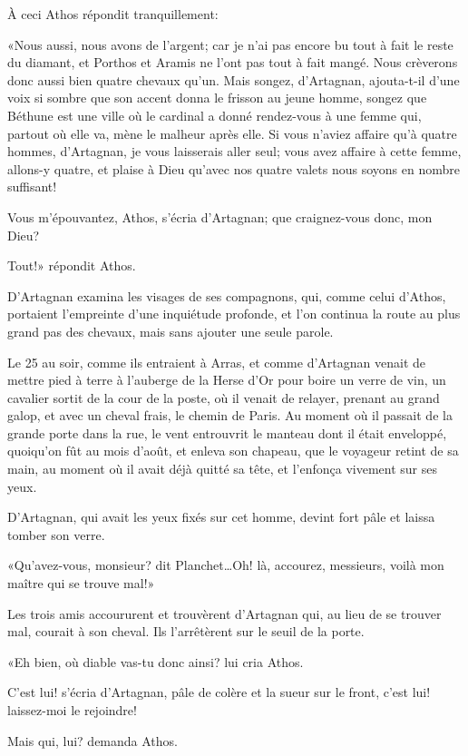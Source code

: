 À ceci Athos répondit tranquillement: 

«Nous aussi, nous avons de l'argent; car je n'ai pas encore bu tout à fait le reste du diamant, et Porthos et Aramis ne l'ont pas tout à fait mangé. Nous crèverons donc aussi bien quatre chevaux qu'un. Mais songez, d'Artagnan, ajouta-t-il d'une voix si sombre que son accent donna le frisson au jeune homme, songez que Béthune est une ville où le cardinal a donné rendez-vous à une femme qui, partout où elle va, mène le malheur après elle. Si vous n'aviez affaire qu'à quatre hommes, d'Artagnan, je vous laisserais aller seul; vous avez affaire à cette femme, allons-y quatre, et plaise à Dieu qu'avec nos quatre valets nous soyons en nombre suffisant! 

\speak  Vous m'épouvantez, Athos, s'écria d'Artagnan; que craignez-vous donc, mon Dieu? 

\speak  Tout!» répondit Athos. 

D'Artagnan examina les visages de ses compagnons, qui, comme celui d'Athos, portaient l'empreinte d'une inquiétude profonde, et l'on continua la route au plus grand pas des chevaux, mais sans ajouter une seule parole. 

Le 25 au soir, comme ils entraient à Arras, et comme d'Artagnan venait de mettre pied à terre à l'auberge de la Herse d'Or pour boire un verre de vin, un cavalier sortit de la cour de la poste, où il venait de relayer, prenant au grand galop, et avec un cheval frais, le chemin de Paris. Au moment où il passait de la grande porte dans la rue, le vent entrouvrit le manteau dont il était enveloppé, quoiqu'on fût au mois d'août, et enleva son chapeau, que le voyageur retint de sa main, au moment où il avait déjà quitté sa tête, et l'enfonça vivement sur ses yeux. 

D'Artagnan, qui avait les yeux fixés sur cet homme, devint fort pâle et laissa tomber son verre. 

«Qu'avez-vous, monsieur? dit Planchet\dots Oh! là, accourez, messieurs, voilà mon maître qui se trouve mal!» 

Les trois amis accoururent et trouvèrent d'Artagnan qui, au lieu de se trouver mal, courait à son cheval. Ils l'arrêtèrent sur le seuil de la porte. 

«Eh bien, où diable vas-tu donc ainsi? lui cria Athos. 

\speak  C'est lui! s'écria d'Artagnan, pâle de colère et la sueur sur le front, c'est lui! laissez-moi le rejoindre! 

\speak  Mais qui, lui? demanda Athos. 

